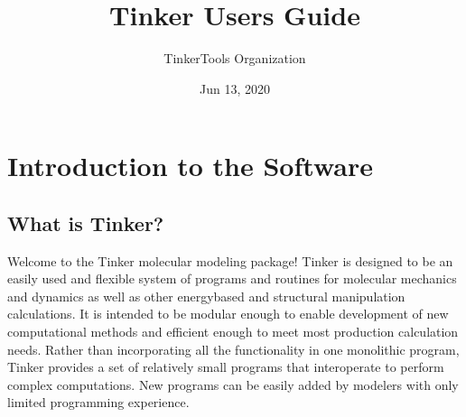 \documentclass[letterpaper,11pt,english]{sphinxmanual}
\title{Tinker User\textquotesingle{}s Guide}
\date{Jun 13, 2020}
\author{TinkerTools Organization}
\begin{document}
\pagestyle{empty}
\sphinxmaketitle
\pagestyle{plain}
\sphinxtableofcontents
\pagestyle{normal}
\label{\detokenize{index::doc}}



\chapter{Introduction to the Software}
\label{\detokenize{text/introduction:introduction-to-the-software}}\label{\detokenize{text/introduction::doc}}

\section{What is Tinker?}
\label{\detokenize{text/introduction:what-is-tinker}}
Welcome to the Tinker molecular modeling package! Tinker is designed to be an easily used and flexible system of programs and routines for molecular mechanics and dynamics as well as other energy\sphinxhyphen{}based and structural manipulation calculations. It is intended to be modular enough to enable development of new computational methods and efficient enough to meet most production calculation needs. Rather than incorporating all the functionality in one monolithic program, Tinker provides a set of relatively small programs that interoperate to perform complex computations. New programs can be easily added by modelers with only limited programming experience.
\end{document}
